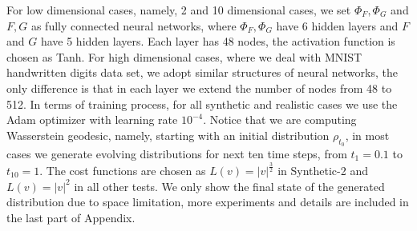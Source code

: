 \documentclass{article}
\begin{document}
For low dimensional cases, namely, 2 and 10 dimensional cases, we set $\Phi_F, \Phi_G$ and $F, G$ as fully connected neural networks, where $\Phi_F, \Phi_G$ have 6 hidden layers and $F$ and $G$ have 5 hidden layers. Each layer has 48 nodes, the activation function is chosen as Tanh. For high dimensional cases, where we deal with MNIST handwritten digits data set, we adopt similar structures of neural networks, the only difference is that in each layer we extend the number of nodes from 48 to 512. In terms of training process, for all synthetic and realistic cases we use the Adam optimizer \citep{kingma2014adam} with learning rate $10^{-4}$. Notice that we are computing Wasserstein geodesic, namely, starting with an initial distribution $\rho_{t_0}$, in most cases we generate evolving distributions for next ten time steps, from $t_1=0.1$ to $t_{10}=1$. The cost functions are chosen as $L(v)=|v|^{\frac{3}{2}}$ in Synthetic-2 and $L(v)=|v|^2$ in all other tests. We only show the final state of the generated distribution due to space limitation, more experiments and details are included in the last part of Appendix.

\end{document}
